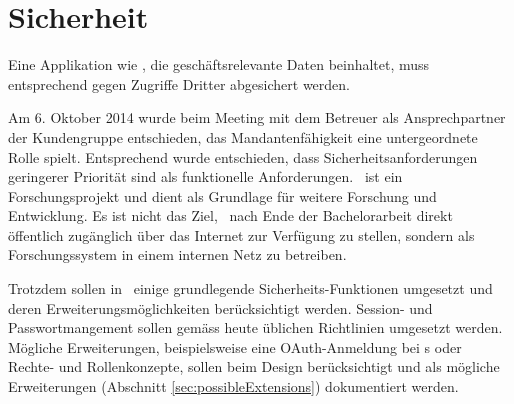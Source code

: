 \section{Sicherheit}
	Eine Applikation wie \eeppi , die geschäftsrelevante Daten beinhaltet, muss entsprechend gegen Zugriffe Dritter abgesichert werden.
	
	Am 6. Oktober 2014 wurde beim Meeting mit dem Betreuer als Ansprechpartner der Kundengruppe entschieden,
	das Mandantenfähigkeit eine untergeordnete Rolle spielt.
	Entsprechend wurde entschieden, dass Sicherheitsanforderungen geringerer Priorität sind als funktionelle Anforderungen.
	\eeppi\ ist ein Forschungsprojekt und dient als Grundlage für weitere Forschung und Entwicklung. Es ist nicht das Ziel, \eeppi\ nach Ende der Bachelorarbeit direkt öffentlich zugänglich über das Internet zur Verfügung zu stellen, sondern als Forschungssystem in einem internen Netz zu betreiben.
	
	Trotzdem sollen in \eeppi\ einige grundlegende Sicherheits-Funktionen umgesetzt und deren Erweiterungsmöglichkeiten berücksichtigt werden.
	Session- und Passwortmangement sollen gemäss heute üblichen Richtlinien umgesetzt werden.
	Mögliche Erweiterungen, beispielsweise eine OAuth-Anmeldung bei \ppt s oder Rechte- und Rollenkonzepte, sollen beim Design berücksichtigt und als mögliche Erweiterungen (Abschnitt \ref{sec:possibleExtensions}) dokumentiert werden.